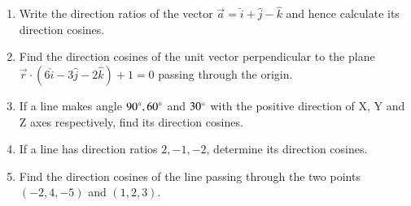 \begin{enumerate}[label=\thesubsection.\arabic*, ref=\thesubsection.\theenumi]
\item Write the direction ratios of the vector $\overrightarrow{a} = \hat{i} +\hat{j} -\hat{k}$ and hence calculate its direction cosines.
\item Find the direction cosines of the unit vector perpendicular to the plane $\overrightarrow{r} \cdot(6 \hat{i}- 3 \hat{j}- 2 \hat{k})+ 1= 0$ passing through the origin.
\item If a line makes angle $90 \degree, 60 \degree$ and $30 \degree$ with the positive direction of X, Y and Z axes respectively, find its direction cosines.
\item If a line has direction ratios $2, -1, -2$, determine its direction cosines.
\item Find the direction cosines of the line passing through the two points $(-2, 4, -5)$ and $(1, 2, 3)$.
\end{enumerate}
